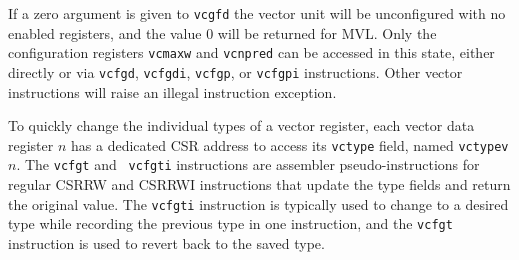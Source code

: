 If a zero argument is given to {\tt vcgfd} the vector unit will be
unconfigured with no enabled registers, and the value 0 will be
returned for MVL.  Only the configuration registers {\tt vcmaxw} and
{\tt vcnpred} can be accessed in this state, either directly or via
{\tt vcfgd}, {\tt vcfgdi}, {\tt vcfgp}, or {\tt vcfgpi}
instructions. Other vector instructions will raise an illegal
instruction exception.

To quickly change the individual types of a vector register, each
vector data register $n$ has a dedicated CSR address to access its
{\tt vctype} field, named {\tt vctypev}$n$.  The {\tt vcfgt} and {\tt
  vcfgti} instructions are assembler pseudo-instructions for regular
CSRRW and CSRRWI instructions that update the type fields and return
the original value.  The {\tt vcfgti} instruction is typically used to
change to a desired type while recording the previous type in one
instruction, and the {\tt vcfgt} instruction is used to revert back to
the saved type.












